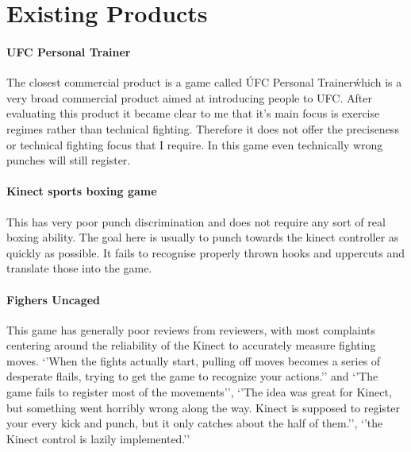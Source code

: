 \section{Existing Products}
\paragraph{UFC Personal Trainer}
The closest commercial product is a game called \'UFC Personal Trainer\' which is a very broad commercial product aimed at introducing people to UFC. After evaluating this product it became clear to me that it’s main focus is  exercise regimes rather than technical fighting. Therefore it does not offer the preciseness or technical fighting focus that I require. In this game even technically wrong punches will still register.

\paragraph{Kinect sports boxing game}
This has very poor punch discrimination and does not require any sort of real boxing ability. The goal here is usually to punch towards the kinect controller as quickly as possible. It fails to recognise properly thrown hooks and uppercuts and translate those into the game. 

\paragraph{Fighers Uncaged}
This game has generally poor reviews from reviewers, with most complaints centering around the reliability of the Kinect to accurately measure fighting moves. \cite{gamerev1} `'When the fights actually start, pulling off moves becomes a series of desperate flails, trying to get the game to recognize your actions.''\cite{gamerev2} 
and `'The game fails to register most of the movements'', `'The idea was great for Kinect, but something went horribly wrong along the way. Kinect is supposed to register your every kick and punch, but it only catches about the half of them.'', `'the Kinect control is lazily implemented.''\cite{gamerev3}



